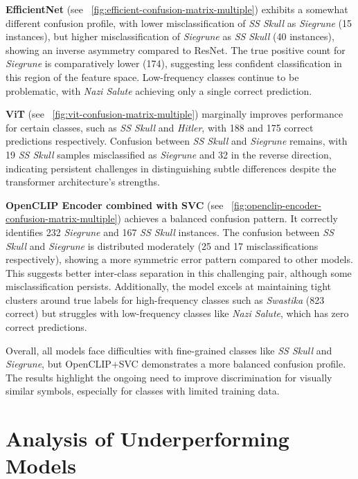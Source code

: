 \textbf{EfficientNet} (see ~\autoref{fig:efficient-confusion-matrix-multiple}) exhibits a somewhat different confusion
profile, with lower misclassification of \textit{SS Skull} as \textit{Siegrune} (15 instances), but higher
misclassification of \textit{Siegrune} as \textit{SS Skull} (40 instances), showing an inverse asymmetry compared to
\ac{ResNet}. The true positive count for \textit{Siegrune} is comparatively lower (174), suggesting less confident
classification in this region of the feature space. Low-frequency classes continue to be problematic, with
\textit{Nazi Salute} achieving only a single correct prediction.

\textbf{\ac{ViT}} (see ~\autoref{fig:vit-confusion-matrix-multiple}) marginally improves performance for certain classes, such as
\textit{SS Skull} and \textit{Hitler}, with 188 and 175 correct predictions respectively. Confusion between
\textit{SS Skull} and \textit{Siegrune} remains, with 19 \textit{SS Skull} samples misclassified as \textit{Siegrune} and 32 in the
reverse direction, indicating persistent challenges in distinguishing subtle differences despite the transformer
architecture’s strengths.

\textbf{OpenCLIP Encoder combined with \ac{SVC}} (see ~\autoref{fig:openclip-encoder-confusion-matrix-multiple})
achieves a balanced confusion pattern. It correctly identifies 232 \textit{Siegrune} and 167 \textit{SS Skull}
instances. The confusion between \textit{SS Skull} and \textit{Siegrune} is distributed moderately (25 and 17
misclassifications respectively), showing a more symmetric error pattern compared to other models. This suggests
better inter-class separation in this challenging pair, although some misclassification persists. Additionally, the
model excels at maintaining tight clusters around true labels for high-frequency classes such as
\textit{Swastika} (823 correct) but struggles with low-frequency classes like \textit{Nazi Salute}, which has zero
correct predictions.

Overall, all models face difficulties with fine-grained classes like \textit{SS Skull} and \textit{Siegrune}, but
OpenCLIP+\ac{SVC} demonstrates a more balanced confusion profile. The results highlight the ongoing need to improve
discrimination for visually similar symbols, especially for classes with limited training data.

\section{Analysis of Underperforming Models}

